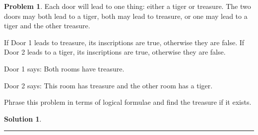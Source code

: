 \documentclass{article}
\theoremstyle{definition}
\newtheorem{problem}{Problem}
\def\fline{\rule{0.75\linewidth}{0.5pt}}
\newcommand{\finishline}{\begin{center}\fline\end{center}}
\newtheorem*{solution*}{Solution}
\newenvironment{solution}{\begin{solution*}}{{\finishline} \end{solution*}}
\begin{document}
\begin{problem}
Each door will lead to one thing: either a tiger or treasure. The two doors may both lead to a tiger, both may lead to treasure, or one may lead to a tiger and the other treasure.

If Door 1 leads to treasure, its inscriptions are true, otherwise they are false. If Door 2 leads to a tiger, its inscriptions are true, otherwise they are false.

Door 1 says: Both rooms have treasure.

Door 2 says: This room has treasure and the other room has a tiger.

Phrase this problem in terms of logical formulae and find the treasure if it exists.

\begin{solution}


    
\end{solution}

\end{problem}
\end{document}
